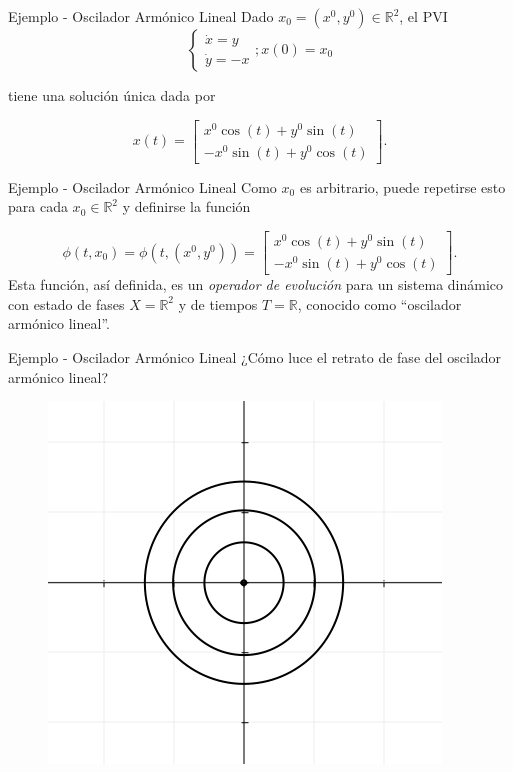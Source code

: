 \documentclass{beamer}
\newcommand{\R}{{\ensuremath{\mathbb{R}}}}
\begin{document}
\begin{frame}{Ejemplo - Oscilador Armónico Lineal}
Dado $x_0 = (x^0,y^0) \in \R^2$, el PVI
$$
\left\{ \begin{array}{l}
	\dot{x} =  y \\
	\dot{y} = -x
\end{array} \right.; x(0) = x_0
$$

tiene una solución única dada por

$$
x(t) = \left[ \begin{array}{l}
		 x^0 \cos(t) + y^0 \sin(t) \\
		-x^0 \sin(t) + y^0 \cos(t)
	\end{array} \right].
$$
\end{frame}

\begin{frame}{Ejemplo - Oscilador Armónico Lineal}
Como $x_0$ es arbitrario, puede repetirse esto para cada $x_0 \in \R^2$ y definirse la función

$$ \phi(t,x_0) = \phi(t, (x^0, y^0) ) = \left[{
	\begin{array}{l}
		x^0 \cos(t) + y^0 \sin(t) \\
		-x^0 \sin(t) + y^0 \cos(t)
	\end{array}} \right].
$$
\pause
Esta función, así definida, es un \emph{operador de evolución} para un sistema dinámico con estado de fases $X = \R^2$ y de tiempos $T = \R$, conocido como ``oscilador armónico lineal''.
\end{frame}

\begin{frame}{Ejemplo - Oscilador Armónico Lineal}
¿Cómo luce el retrato de fase del oscilador armónico lineal?
\pause
\begin{figure}[h] \centering
    \includegraphics[scale=0.5]{../figures/osciladorarmonico-diagramafase.png}
\end{figure}
\end{frame}
\end{document}

